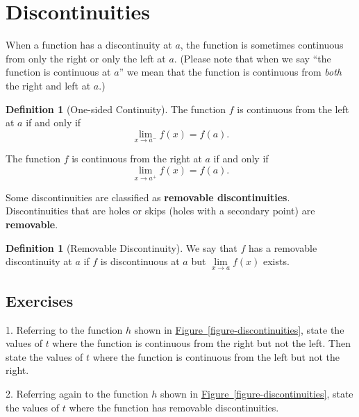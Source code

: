 \documentclass[12pt,]{book}
\newcommand{\terminology}[1]{\textbf{#1}}
\theoremstyle{plain}
\theoremstyle{definition}
\newtheorem{definition}[theorem]{Definition}
\theoremstyle{definition}
\theoremstyle{definition}
\theoremstyle{definition}
\theoremstyle{definition}
\numberwithin{equation}{section}
\newcommand{\fe}[2]{#1\mathopen{}\left(#2\right)\mathclose{}}
\begin{document}
\section[{Discontinuities}]{Discontinuities}\label{section-discontinuities}
When a function has a discontinuity at \(a\), the function is sometimes continuous from only the right or only the left at \(a\). (Please note that when we say ``the function is continuous at \(a\)'' we mean that the function is continuous from \emph{both} the right and left at \(a\).)%
\begin{definition}[{One-sided Continuity}]\label{definition-4}
The function \(f\) is continuous from the left at \(a\) if and only if \begin{equation*}\lim\limits_{x\to a^{-}}\fe{f}{x}=\fe{f}{a}\text{.}\end{equation*}%
\par
The function \(f\) is continuous from the right at \(a\) if and only if \begin{equation*}\lim\limits_{x\to a^{+}}\fe{f}{x}=\fe{f}{a}\text{.}\end{equation*}%
\end{definition}
\par
Some discontinuities are classified as \terminology{removable discontinuities}. Discontinuities that are holes or skips (holes with a secondary point) are \terminology{removable}.%
\begin{definition}[{Removable Discontinuity}]\label{definition-5}
We say that \(f\) has a removable discontinuity at \(a\) if \(f\) is discontinuous at \(a\) but \(\lim\limits_{x\to a}\fe{f}{x}\) exists.%
\end{definition}
\typeout{************************************************}
\typeout{************************************************}
\subsection[{Exercises}]{Exercises}\label{exercises-14}
\begin{exerciselist}
\item[1.]\hypertarget{exercise-111}{}Referring to the function \(h\) shown in \hyperref[figure-discontinuities]{Figure~\ref{figure-discontinuities}}, state the values of \(t\) where the function is continuous from the right but not the left. Then state the values of \(t\) where the function is continuous from the left but not the right.%
\par\smallskip
\item[2.]\hypertarget{exercise-112}{}Referring again to the function \(h\) shown in \hyperref[figure-discontinuities]{Figure~\ref{figure-discontinuities}}, state the values of \(t\) where the function has removable discontinuities.%
\par\smallskip
\end{exerciselist}
\typeout{************************************************}
\typeout{************************************************}
\end{document}
